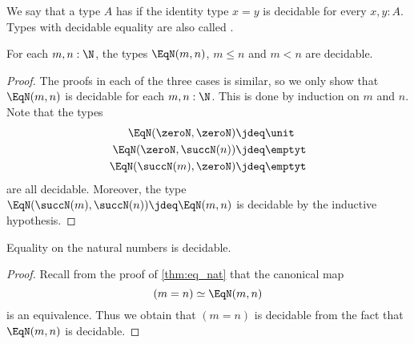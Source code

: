 \begin{defn}
  We say that a type $A$ has  if the identity type $x=y$ is decidable for every $x,y:A$. Types with decidable equality are also called .
\end{defn}

\begin{lem}
  For each $m,n:\N$, the types $\EqN(m,n)$, $m\leq n$ and $m<n$ are decidable.
\end{lem}

\begin{proof}
  The proofs in each of the three cases is similar, so we only show that $\EqN(m,n)$ is decidable for each $m,n:\N$. This is done by induction on $m$ and $n$. Note that the types
  \begin{align*}
    \EqN(\zeroN,\zeroN) & \jdeq \unit \\
    \EqN(\zeroN,\succN(n)) & \jdeq \emptyt \\
    \EqN(\succN(m),\zeroN) & \jdeq \emptyt 
  \end{align*}
  are all decidable. Moreover, the type $\EqN(\succN(m),\succN(n))\jdeq \EqN(m,n)$ is decidable by the inductive hypothesis.
\end{proof}

\begin{cor}
  Equality on the natural numbers is decidable.
\end{cor}

\begin{proof}
  Recall from the proof of \cref{thm:eq_nat} that the canonical map
  \begin{equation*}
    (m=n)\simeq \EqN(m,n)
  \end{equation*}
  is an equivalence. Thus we obtain that $(m=n)$ is decidable from the fact that $\EqN(m,n)$ is decidable.
\end{proof}

